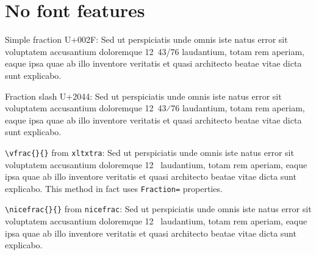 \documentclass[12pt,twoside,a4paper]{book}
\newcommand{\setheaders}[2]{%
\markboth{\sc{\hfill{}#1\hfill}}%
         {\sc{\hfill{}#2\hfill}}%
}
\begin{document}
\setheaders{}{}


\mainmatter







\section{No font features}

Simple fraction U+002F: Sed ut perspiciatis unde omnis iste natus error sit voluptatem accusantium doloremque 12~43/76 laudantium, totam rem aperiam, eaque ipsa quae ab illo inventore veritatis et quasi architecto beatae vitae dicta sunt explicabo.

Fraction slash U+2044: Sed ut perspiciatis unde omnis iste natus error sit voluptatem accusantium doloremque 12~43⁄76 laudantium, totam rem aperiam, eaque ipsa quae ab illo inventore veritatis et quasi architecto beatae vitae dicta sunt explicabo.

\verb+\vfrac{}{}+ from \verb+xltxtra+: Sed ut perspiciatis unde omnis iste natus error sit voluptatem accusantium doloremque 12~ laudantium, totam rem aperiam, eaque ipsa quae ab illo inventore veritatis et quasi architecto beatae vitae dicta sunt explicabo. This method in fact uses \verb+Fraction=+ properties.

\verb+\nicefrac{}{}+ from \verb+nicefrac+: Sed ut perspiciatis unde omnis iste natus error sit voluptatem accusantium doloremque 12~ laudantium, totam rem aperiam, eaque ipsa quae ab illo inventore veritatis et quasi architecto beatae vitae dicta sunt explicabo.
\end{document}
